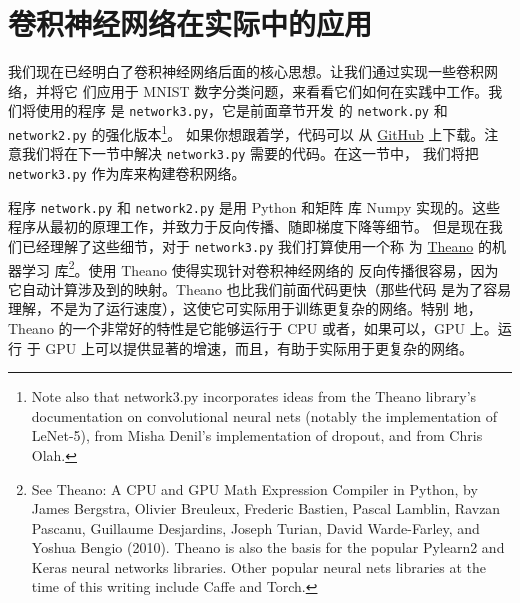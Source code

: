\section{卷积神经网络在实际中的应用}
\label{seq:convolutional_neural_networks_in_practice}

我们现在已经明白了卷积神经网络后面的核心思想。让我们通过实现一些卷积网络，并将它
们应用于 MNIST 数字分类问题，来看看它们如何在实践中工作。我们将使用的程序
是 \lstinline!network3.py!，它是前面章节开发
的 \lstinline!network.py! 和 \lstinline!network2.py! 的强化版本\footnote{Note
  also that network3.py incorporates ideas from the Theano library's
  documentation on convolutional neural nets (notably the implementation of
  LeNet-5), from Misha Denil's implementation of dropout, and from Chris Olah.}。
如果你想跟着学，代码可以
从
\href{https://github.com/mnielsen/neural-networks-and-deep-learning/blob/master/src/network3.py}{GitHub}
上下载。注意我们将在下一节中解决 \lstinline!network3.py! 需要的代码。在这一节中，
我们将把 \lstinline!network3.py! 作为库来构建卷积网络。

程序 \lstinline!network.py! 和 \lstinline!network2.py! 是用 Python 和矩阵
库 Numpy 实现的。这些程序从最初的原理工作，并致力于反向传播、随即梯度下降等细节。
但是现在我们已经理解了这些细节，对于 \lstinline!network3.py! 我们打算使用一个称
为 \href{http://deeplearning.net/software/theano/}{Theano} 的机器学习
库\footnote{See Theano: A CPU and GPU Math Expression Compiler in Python, by
  James Bergstra, Olivier Breuleux, Frederic Bastien, Pascal Lamblin, Ravzan
  Pascanu, Guillaume Desjardins, Joseph Turian, David Warde-Farley, and Yoshua
  Bengio (2010). Theano is also the basis for the popular Pylearn2 and Keras
  neural networks libraries. Other popular neural nets libraries at the time of
  this writing include Caffe and Torch.}。使用 Theano 使得实现针对卷积神经网络的
反向传播很容易，因为它自动计算涉及到的映射。Theano 也比我们前面代码更快（那些代码
是为了容易理解，不是为了运行速度），这使它可实际用于训练更复杂的网络。特别
地，Theano 的一个非常好的特性是它能够运行于 CPU 或者，如果可以，GPU 上。运行
于 GPU 上可以提供显著的增速，而且，有助于实际用于更复杂的网络。

